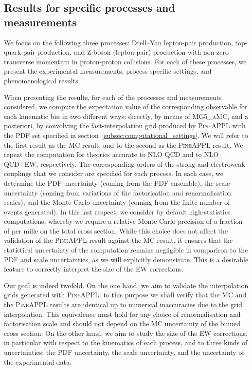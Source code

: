 \subsection{Results for specific processes and measurements}
\label{subsec:processes_and_measurements}

We focus on the following three processes: Drell--Yan lepton-pair production,
top-quark pair production, and Z-boson (lepton-pair) production with non-zero
transverse momentum in proton-proton collisions. For each of these processes,
we present the experimental measurements, process-specific settings, and phenomenological results.

When presenting the results, for each of the processes and measurements considered, we compute the expectation
value of the corresponding observable for each kinematic bin in two different
ways: directly, by means of \textsc{MG5\_aMC}, and a posteriori, by convolving
the fast-interpolation grid produced by \textsc{PineAPPL} with the PDF set
specified in section~\ref{subsec:computational_settings}. We
will refer to the first result as the MC result, and to the second as
the \textsc{PineAPPL} result. We repeat the computation for theories accurate
to NLO QCD and to NLO QCD+EW, respectively. The corresponding orders of the
strong and electroweak couplings that we consider are specified for each process. In each case, we determine the
PDF uncertainty (coming from the PDF ensemble), the scale uncertainty (coming
from variations of the factorisation and renormalisation scales), and the Monte
Carlo uncertainty (coming from the finite number of events generated). In this
last respect, we consider by default high-statistics computations, whereby we
require a relative Monte Carlo precision of a fraction of per mille on the total cross section. While
this choice does not affect the validation of the \textsc{PineAPPL} result
against the MC result, it ensures that the statistical uncertainty of
the computation remains negligible in comparison to the PDF and scale
uncertainties, as we will explicitly demonstrate. This is a desirable feature
to correctly interpret the size of the EW corrections.

Our goal is indeed twofold. On the one hand, we aim to validate the
interpolation grids generated with \textsc{PineAPPL}: to this purpose we shall
verify that the MC and the \textsc{PineAPPL} results are identical up to
numerical inaccuracies due to the grid interpolation. This equivalence must
hold for any choice of renormalisation and factorisation scale and should not
depend on the MC uncertainty of the binned cross section. On the other
hand, we aim to study the size of the EW corrections, in particular with
respect to the kinematics of each process, and to three kinds of uncertainties:
the PDF uncertainty, the scale uncertainty, and the uncertainty of the
experimental data.

